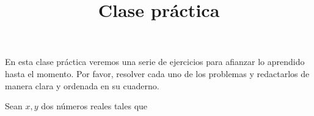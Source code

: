 \documentclass[12pt]{article}
\title{Clase práctica}
\begin{document}
    \maketitle
    En esta clase práctica veremos una serie de ejercicios para afianzar lo aprendido hasta el momento.
    Por favor, resolver cada uno de los problemas y redactarlos de manera clara y ordenada en su cuaderno.

    Sean $x,y$ dos números reales tales que
\end{document}
